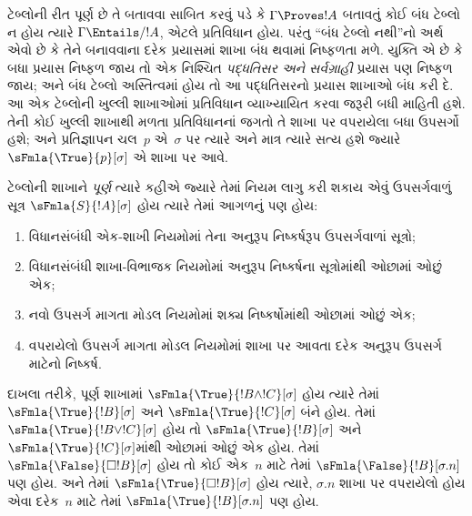 \begingroup
\makeatletter{}\makeatother


\label{guunit:OLP-0468}


\begin{explain}
  ટેબ્લોની રીત પૂર્ણ છે તે બતાવવા સાબિત કરવું પડે કે
  $\Gamma \Proves !A$ બતાવતું કોઈ બંધ ટેબ્લો ન હોય ત્યારે
  $\Gamma \Entails/ !A$, એટલે પ્રતિવિધાન હોય. પરંતુ ``બંધ
  ટેબ્લો નથી''નો અર્થ એવો છે કે તેને બનાવવાના દરેક પ્રયાસમાં
  શાખા બંધ થવામાં નિષ્ફળતા મળે. યુક્તિ એ છે કે બધા પ્રયાસ નિષ્ફળ
  જાય તો એક નિશ્ચિત \emph{પદ્ધતિસર અને સર્વગ્રાહી} પ્રયાસ પણ
  નિષ્ફળ જાય; અને બંધ ટેબ્લો અસ્તિત્વમાં હોય તો આ
  પદ્ધતિસરનો પ્રયાસ શાખાઓ બંધ કરી દે. આ એક ટેબ્લોની ખુલ્લી
  શાખાઓમાં પ્રતિવિધાન વ્યાખ્યાયિત કરવા જરૂરી બધી માહિતી હશે.
  તેની કોઈ ખુલ્લી શાખાથી મળતા પ્રતિવિધાનનાં જગતો તે શાખા પર
  વપરાયેલા બધા ઉપસર્ગો હશે; અને પ્રતિજ્ઞાપન ચલ~$p$ એ~$\sigma$ પર ત્યારે અને માત્ર ત્યારે સત્ય હશે
  જ્યારે $\sFmla{\True}{p}[\sigma]$ એ શાખા પર આવે.
\end{explain}

\begin{defn}
  ટેબ્લોની શાખાને \emph{પૂર્ણ} ત્યારે કહીએ જ્યારે તેમાં
  નિયમ લાગુ કરી શકાય એવું ઉપસર્ગવાળું સૂત્ર
  $\sFmla{S}{!A}[\sigma]$ હોય ત્યારે તેમાં આગળનું પણ હોય:
  \begin{enumerate}
    \item વિધાનસંબંધી એક-શાખી નિયમોમાં તેના અનુરૂપ નિષ્કર્ષરૂપ
      ઉપસર્ગવાળાં સૂત્રો;
    \item વિધાનસંબંધી શાખા-વિભાજક નિયમોમાં અનુરૂપ નિષ્કર્ષના
      સૂત્રોમાંથી ઓછામાં ઓછું એક;
    \item નવો ઉપસર્ગ માગતા મોડલ નિયમોમાં શક્ય નિષ્કર્ષોમાંથી
      ઓછામાં ઓછું એક;
    \item વપરાયેલો ઉપસર્ગ માગતા મોડલ નિયમોમાં શાખા પર આવતા
      દરેક અનુરૂપ ઉપસર્ગ માટેનો નિષ્કર્ષ.
  \end{enumerate}
\end{defn}

\begin{explain}
દાખલા તરીકે, પૂર્ણ શાખામાં $\sFmla{\True}{!B \land !C}[\sigma]$
હોય ત્યારે તેમાં $\sFmla{\True}{!B}[\sigma]$ અને
$\sFmla{\True}{!C}[\sigma]$ બંને હોય. તેમાં
$\sFmla{\True}{!B \lor !C}[\sigma]$ હોય તો
$\sFmla{\True}{!B}[\sigma]$ અને
$\sFmla{\True}{!C}[\sigma]$માંથી ઓછામાં ઓછું એક હોય.
તેમાં $\sFmla{\False}{\Box !B}[\sigma]$ હોય તો કોઈ એક~$n$
માટે તેમાં $\sFmla{\False}{!B}[\sigma.n]$ પણ હોય. અને તેમાં
$\sFmla{\True}{\Box !B}[\sigma]$ હોય ત્યારે,
$\sigma.n$ શાખા પર વપરાયેલો હોય એવા દરેક~$n$ માટે તેમાં
$\sFmla{\True}{!B}[\sigma.n]$ પણ હોય.
\end{explain}


